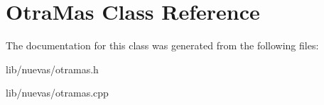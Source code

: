 \hypertarget{class_otra_mas}{\section{Otra\+Mas Class Reference}
\label{class_otra_mas}
}


The documentation for this class was generated from the following files\+:\begin{DoxyCompactItemize}
\item 
lib/nuevas/otramas.\+h\item 
lib/nuevas/otramas.\+cpp\end{DoxyCompactItemize}
